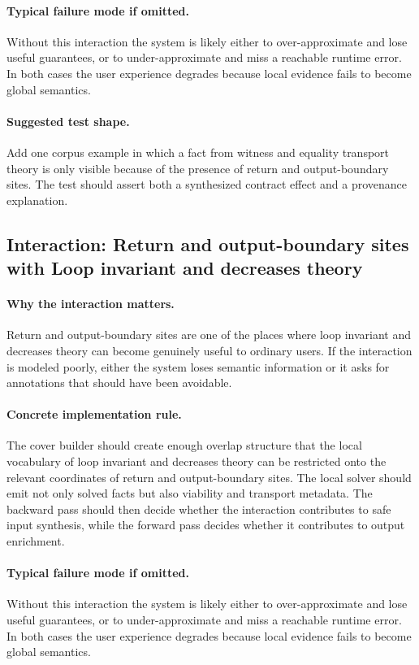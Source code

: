 \documentclass[11pt]{report}
\theoremstyle{definition}
\theoremstyle{plain}
\begin{document}
\paragraph{Typical failure mode if omitted.}
Without this interaction the system is likely either to over-approximate and
lose useful guarantees, or to under-approximate and miss a reachable runtime
error. In both cases the user experience degrades because local evidence
fails to become global semantics.

\paragraph{Suggested test shape.}
Add one corpus example in which a fact from witness and equality transport theory is only
visible because of the presence of return and output-boundary sites. The test should
assert both a synthesized contract effect and a provenance explanation.

\subsection{Interaction: Return and output-boundary sites with Loop invariant and decreases theory}

\paragraph{Why the interaction matters.}
Return and output-boundary sites are one of the places where loop invariant and decreases theory can become
genuinely useful to ordinary users. If the interaction is modeled poorly,
either the system loses semantic information or it asks for annotations that
should have been avoidable.

\paragraph{Concrete implementation rule.}
The cover builder should create enough overlap structure that the local
vocabulary of loop invariant and decreases theory can be restricted onto the relevant
coordinates of return and output-boundary sites. The local solver should emit not only
solved facts but also viability and transport metadata. The backward pass
should then decide whether the interaction contributes to safe input
synthesis, while the forward pass decides whether it contributes to output
enrichment.

\paragraph{Typical failure mode if omitted.}
Without this interaction the system is likely either to over-approximate and
lose useful guarantees, or to under-approximate and miss a reachable runtime
error. In both cases the user experience degrades because local evidence
fails to become global semantics.
\end{document}
